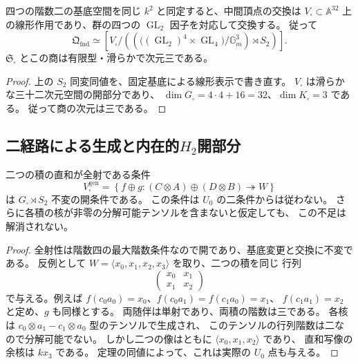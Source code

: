 \begin{corollary}[三十二次元の線形表示]
\label{cor:qa-square-linear-presentation-normal-stack}
四つの階数二の基底空間を同じ $k^2$ と同定すると、中間頂点の交換は
$V_\square\subset\mathbb A^{32}$ 上の線形作用であり、群の四つの
$\operatorname{GL}_2$ 因子を対応して交換する。
従って
\[
 \mathfrak Q_{\mathrm{fnd}}\simeq
 \left[V_\square\Big/
 \left(\left(\big((\operatorname{GL}_2)^4\times\operatorname{GL}_4\big)
 /\mathbb G_m^3\right)\rtimes S_2\right)\right].
\]
$\mathfrak S_\square$ とこの商は有限型・滑らかで次元三である。
\end{corollary}
\begin{proof}
上の $S_2$ 同変同値を、固定基底による線形表示で書き直す。
$V_\square$ は滑らかな三十二次元空間の開部分であり、
$\dim G_\square=4\cdot4+16=32$、$\dim K_\square=3$ である。
従って商の次元は三である。
\end{proof}

\subsection{二経路による生成と内在的\texorpdfstring{$H_2$}{H2}開部分}

\begin{proposition}[二積の同時全射性は追加の開条件]
\label{prop:qa-square-joint-generation-open}
二つの積の直和が全射である条件
\[
 V_\square^{\mathrm{gen}}
 =\left\{f\oplus g:(C\otimes A)\oplus(D\otimes B)
                 \twoheadrightarrow W\right\}
\]
は $G_\square\rtimes S_2$ 不変の開条件である。
この条件は $U_0$ の二条件からは従わない。
さらに各積の核が非零の分解可能テンソルを含まないと仮定しても、
この不足は解消されない。
\end{proposition}
\begin{proof}
全射性は階数四の最大階数条件なので開であり、基底変更と交換に不変である。
反例として $W=\langle x_0,x_1,x_2,x_3\rangle$ を取り、二つの積を同じ
行列
\[
 \begin{pmatrix}x_0&x_1\\x_1&x_2\end{pmatrix}
\]
で与える。例えば $f(c_0a_0)=x_0$、$f(c_0a_1)=f(c_1a_0)=x_1$、
$f(c_1a_1)=x_2$ と定め、$g$ も同様とする。
両随伴は単射であり、両積の階数は三である。
各核は $c_0\otimes a_1-c_1\otimes a_0$ 型のテンソルで生成され、
このテンソルの行列階数は二なので分解可能でない。
しかし二つの像はともに $\langle x_0,x_1,x_2\rangle$ であり、
直和写像の余核は $kx_3$ である。
定理の同値によって、これは実際の $U_0$ 点も与える。
\end{proof}

